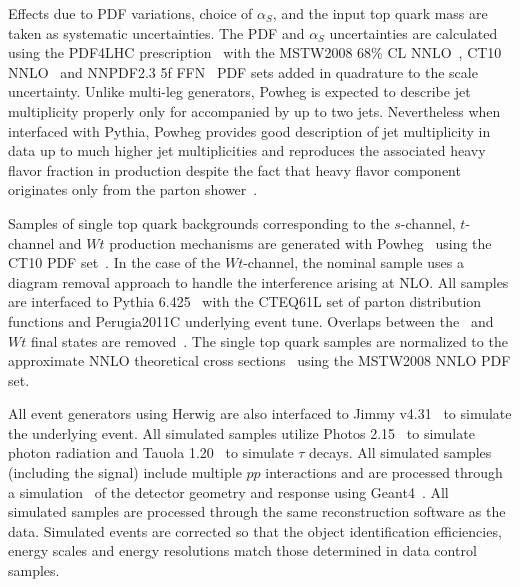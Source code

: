 Effects due to PDF variations, choice of $\alpha_S$, and the input top quark mass are taken as systematic uncertainties. The PDF and $\alpha_S$ uncertainties are calculated using the PDF4LHC prescription~\cite{ref:pdf4lhc} with the MSTW2008 68\% CL NNLO~\cite{mstw1,mstw2}, CT10 NNLO~\cite{Lai:2010vv,ct102} and NNPDF2.3 5f FFN~\cite{nnpdf} PDF sets added in quadrature to the scale uncertainty. Unlike multi-leg generators, {\sc Powheg} is expected to describe jet multiplicity properly only for \ttbar accompanied by up to two jets. Nevertheless when interfaced with {\sc Pythia}, {\sc Powheg} provides good description of jet multiplicity in data up to much higher jet multiplicities and reproduces the associated heavy flavor fraction in \ttbar production despite the fact that heavy flavor component originates only from the parton shower~\cite{Aad:2015gra}. %


Samples of single top quark backgrounds corresponding to the $s$-channel, $t$-channel and $Wt$ production mechanisms are generated with {\sc Powheg}~\cite{powheg,powbox1,powbox2} using the {\sc CT10} PDF set~\cite{ct10}.  In the case of the $Wt$-channel, the nominal sample uses a diagram removal approach to handle the interference arising at NLO. All samples are interfaced to {\sc Pythia} 6.425~\cite{Sjostrand:2006za} with the {\sc CTEQ61L} set of parton distribution functions and Perugia2011C underlying event tune. Overlaps between the \ttbar\ and $Wt$ final states are removed~\cite{mcatnlo_2}. The single top quark samples are normalized to the approximate NNLO theoretical cross sections~\cite{stopxs,stopxs_2} using the {\sc MSTW2008} NNLO PDF set.

All event generators using {\sc Herwig} are also interfaced to {\sc Jimmy} v4.31~\cite{jimmy} to simulate the underlying event. All simulated samples utilize {\sc Photos 2.15}~\cite{PhotosPaper} to simulate photon radiation and {\sc Tauola 1.20}~\cite{TauolaPaper} to simulate $\tau$ decays. All simulated samples (including the \ttbar signal) include multiple $pp$ interactions and are processed through a simulation~\cite{Aad:2010ah} of the detector geometry and response using {\sc Geant4}~\cite{Agostinelli:2002hh}. All simulated samples are processed through the same reconstruction software as the data. Simulated events are
corrected so that the object identification efficiencies, energy scales and energy resolutions match those determined in data control samples.


